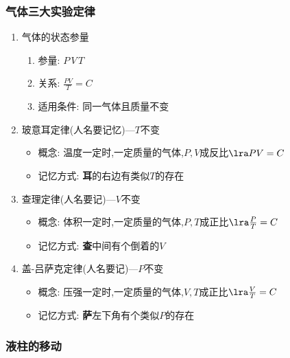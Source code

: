 \documentclass{article}
\begin{document}
\vspace{2em}

\subsubsection{气体三大实验定律}
\begin{enumerate}[label = \arabic*]
    \item 气体的状态参量
          \begin{enumerate}[label = (\arabic*)]
              \item 参量: $P \, V \, T$
              \item 关系: $\frac{PV}{T} = C$
              \item 适用条件: 同一气体且质量不变
          \end{enumerate}
    \item 玻意耳定律(人名要记忆)---$T$不变
          \begin{itemize}
              \item 概念: 温度一定时,一定质量的气体,$P,V$成反比$\lra PV = C$
              \item 记忆方式: \textbf{耳}的右边有类似$T$的存在
          \end{itemize}
    \item 查理定律(人名要记)---$V$不变
          \begin{itemize}
              \item 概念: 体积一定时,一定质量的气体,$P,T$成正比$\lra \frac{P}{T} = C$
              \item 记忆方式: \textbf{查}中间有个倒着的$V$
          \end{itemize}
    \item 盖-吕萨克定律(人名要记)---$P$不变
          \begin{itemize}
              \item 概念: 压强一定时,一定质量的气体,$V,T$成正比$\lra \frac{V}{T} = C$
              \item 记忆方式: \textbf{萨}左下角有个类似$P$的存在
          \end{itemize}
\end{enumerate}

\vspace{2em}

\subsubsection{液柱的移动}

\vspace{2em}
\end{document}
